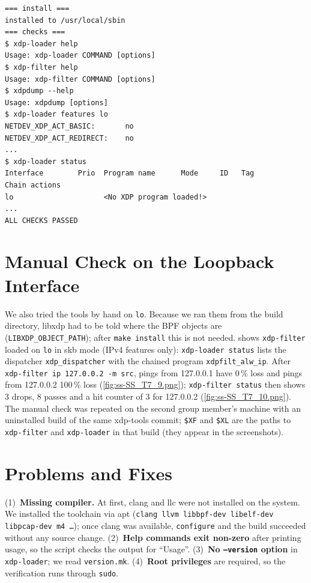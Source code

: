 \begin{lstlisting}[style=bashsh,float=htbp,caption={Abridged excerpt of \texttt{install\_verify.log}.},label=lst:t5-verify]
=== install ===
installed to /usr/local/sbin
=== checks ===
$ xdp-loader help
Usage: xdp-loader COMMAND [options]
$ xdp-filter help
Usage: xdp-filter COMMAND [options]
$ xdpdump --help
Usage: xdpdump [options]
$ xdp-loader features lo
NETDEV_XDP_ACT_BASIC:		no
NETDEV_XDP_ACT_REDIRECT:	no
...
$ xdp-loader status
Interface        Prio  Program name      Mode     ID   Tag               Chain actions
lo                     <No XDP program loaded!>
...
ALL CHECKS PASSED
\end{lstlisting}

\section{Manual Check on the Loopback Interface}\label{sec:t5-manual}
We also tried the tools by hand on \texttt{lo}. Because we ran them from the build directory, libxdp had to be told where the BPF objects are (\texttt{LIBXDP\_OBJECT\_PATH}); after \texttt{make install} this is not needed.  shows \texttt{xdp-filter} loaded on \texttt{lo} in skb mode (IPv4 features only): \texttt{xdp-loader status} lists the dispatcher \texttt{xdp\_dispatcher} with the chained program \texttt{xdpfilt\_alw\_ip}. After \texttt{xdp-filter ip 127.0.0.2 -m src}, pings from 127.0.0.1 have 0\,\% loss and pings from 127.0.0.2 100\,\% loss (\cref{fig:ss-SS_T7_9.png}); \texttt{xdp-filter status} then shows 3 drops, 8 passes and a hit counter of 3 for 127.0.0.2 (\cref{fig:ss-SS_T7_10.png}). The manual check was repeated on the second group member's machine with an uninstalled build of the same xdp-tools commit; \texttt{\$XF} and \texttt{\$XL} are the paths to \texttt{xdp-filter} and \texttt{xdp-loader} in that build (they appear in the screenshots).


\section{Problems and Fixes}\label{sec:t5-problems}
(1)~\textbf{Missing compiler.} At first, clang and llc were not installed on the system. We installed the toolchain via apt (\texttt{clang llvm libbpf-dev libelf-dev libpcap-dev m4 \dots}); once clang was available, \texttt{configure} and the build succeeded without any source change. (2)~\textbf{Help commands exit non-zero} after printing usage, so the script checks the output for \enquote{Usage}. (3)~\textbf{No \texttt{--version} option} in \texttt{xdp-loader}; we read \texttt{version.mk}. (4)~\textbf{Root privileges} are required, so the verification runs through \texttt{sudo}.

